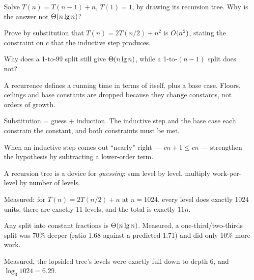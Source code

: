 \begin{checkpoint}
\begin{tightnum}
  \item Solve $T(n) = T(n-1) + n$, $T(1)=1$, by drawing its recursion tree.
        Why is the answer not $\Theta(n \operatorname{lg} n)$?
  \item Prove by substitution that $T(n) = 2T(n/2) + n^{2}$ is $O(n^{2})$,
        stating the constraint on $c$ that the inductive step produces.
  \item Why does a 1-to-99 split still give $\Theta(n\operatorname{lg} n)$, while a
        1-to-$(n-1)$ split does not?
\end{tightnum}
\end{checkpoint}

\begin{chaptersummary}
\begin{tight}
  \item A recurrence defines a running time in terms of itself, plus a base
        case. Floors, ceilings and base constants are dropped because they
        change constants, not orders of growth.
  \item Substitution = guess + induction. The inductive step and the base case
        each constrain the constant, and both constraints must be met.
  \item When an inductive step comes out ``nearly'' right --- $cn+1 \le cn$ ---
        strengthen the hypothesis by subtracting a lower-order term.
  \item A recursion tree is a device for \emph{guessing}: sum level by level,
        multiply work-per-level by number of levels.
  \item Measured: for $T(n)=2T(n/2)+n$ at $n=1024$, every level does exactly
        1024 units, there are exactly 11 levels, and the total is exactly
        $11n$.
  \item Any split into constant fractions is $\Theta(n\operatorname{lg} n)$. Measured, a
        one-third/two-thirds split was 70\% deeper (ratio 1.68 against a
        predicted 1.71) and did only 10\% more work.
  \item Measured, the lopsided tree's levels were exactly full down to depth 6,
        and $\log_{3} 1024 = 6.29$.
\end{tight}
\end{chaptersummary}

